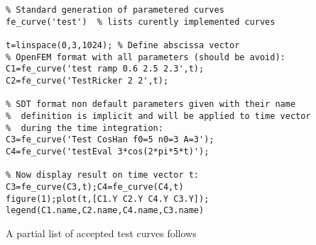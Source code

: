 \begin{SDT}
\begin{verbatim}
% Standard generation of parametered curves
fe_curve('test')  % lists curently implemented curves

t=linspace(0,3,1024); % Define abscissa vector
% OpenFEM format with all parameters (should be avoid):
C1=fe_curve('test ramp 0.6 2.5 2.3',t);
C2=fe_curve('TestRicker 2 2',t);

% SDT format non default parameters given with their name
%  definition is implicit and will be applied to time vector
%  during the time integration: 
C3=fe_curve('Test CosHan f0=5 n0=3 A=3'); 
C4=fe_curve('testEval 3*cos(2*pi*5*t)');

% Now display result on time vector t:
C3=fe_curve(C3,t);C4=fe_curve(C4,t)
figure(1);plot(t,[C1.Y C2.Y C4.Y C3.Y]);
legend(C1.name,C2.name,C4.name,C3.name)
\end{verbatim}%

\end{SDT}


A partial list of accepted test curves follows

